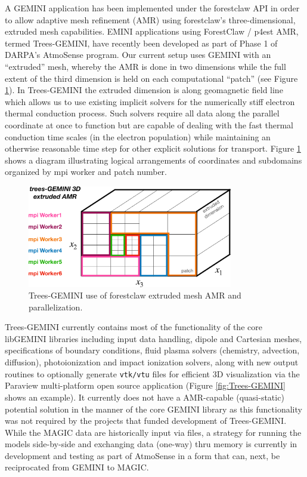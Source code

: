 \documentclass[11pt,letterpaper]{article}
\begin{document}
A GEMINI application has been implemented under the forestclaw API in order to allow adaptive mesh refinement (AMR) using forestclaw's three-dimensional, extruded mesh capabilities.  EMINI applications using ForestClaw / p4est AMR, termed Trees-GEMINI, have recently been developed as part of Phase 1 of DARPA's AtmoSense program.  Our current setup uses GEMINI with an ``extruded'' mesh, whereby the AMR is done in two dimensions while the full extent of the third dimension is held on each computational ``patch'' (see Figure \ref{fig:parallel}).  In Trees-GEMINI the extruded dimension is along geomagnetic field line which allows us to use existing implicit solvers for the numerically stiff electron thermal conduction process.  Such solvers require all data along the parallel coordinate at once to function but are capable of dealing with the fast thermal conduction time scales (in the electron population) while maintaining an otherwise reasonable time step for other explicit solutions for transport.  Figure \ref{fig:parallel} shows a diagram illustrating logical arrangements of coordinates and subdomains organized by mpi worker and patch number.  
\begin{figure}
  \centering
  \includegraphics[width=0.8\textwidth]{./figures/GEMINI_parallel-crop.pdf}
  \caption{Trees-GEMINI use of forestclaw extruded mesh AMR and parallelization.}
  \label{fig:parallel}
\end{figure}

Trees-GEMINI currently contains most of the functionality of the core libGEMINI libraries including input data handling, dipole and Cartesian meshes, specifications of boundary conditions, fluid plasma solvers (chemistry, advection, diffusion), photoionization and impact ionization solvers, along with new output routines to optionally generate \texttt{vtk/vtu} files for efficient 3D visualization via the Paraview multi-platform open source application (Figure \ref{fig:Trees-GEMINI} shows an example).  It currently does not have a AMR-capable (quasi-static) potential solution in the manner of the core GEMINI library as this functionality was not required by the projects that funded development of Trees-GEMINI.  While the MAGIC data are historically input via files, a strategy for running the models side-by-side and exchanging data (one-way) thru memory is currently in development and testing as part of AtmoSense in a form that can, next, be reciprocated from GEMINI to MAGIC.  %
\end{document}
